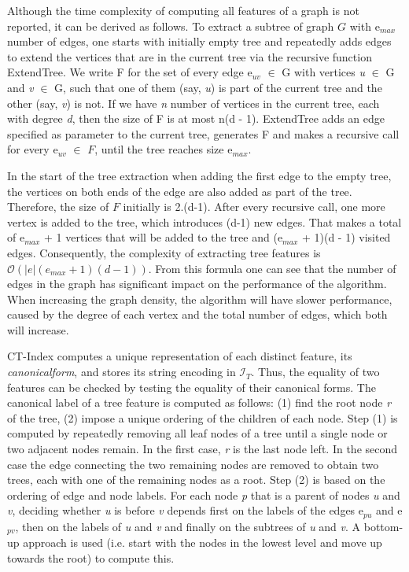 \documentclass{l4proj}
\newcommand{\fancyI}{\mathcal{I}}
\begin{document}
Although the time complexity of computing all features of a graph is not reported, it can be derived as follows. To extract a subtree of graph $G$ with e$_{max}$ number of edges, one starts with initially empty tree and repeatedly adds edges to extend the vertices that are in the current tree via the recursive function ExtendTree. We write F for the set of every edge e$_{uv}$ $\in$ G with vertices \textit{u} $\in$ G and \textit{v} $\in$ G, such that one of them (say, \textit{u}) is part of the current tree and the other (say, \textit{v}) is not. If we have \textit{n} number of vertices in the current tree, each with degree \textit{d}, then the size of F is at most n(d - 1). ExtendTree adds an edge specified as parameter to the current tree, generates F and makes a recursive call for every e$_{uv}$ $\in$ $F$, until the tree reaches size e$_{max}$.

In the start of the \gls{tree} extraction when adding the first edge to the empty tree, the vertices on both ends of the edge are also added as part of the tree. Therefore, the size of $F$ initially is 2.(d-1). After every recursive call, one more vertex is added to the tree, which introduces (d-1) new edges. That makes a total of e$_{max}$ + 1 vertices that will be added to the tree and (e$_{max}$ + 1)(d - 1) visited edges. Consequently, the complexity of extracting tree features is $\mathcal{O}(|e|(e_{max} + 1)(d - 1))$. From this formula one can see that the number of edges in the graph has significant impact on the performance of the algorithm. When increasing the graph density, the algorithm will have slower performance, caused by the degree of each vertex and the total number of edges, which both will increase.

CT-Index computes a unique representation of each distinct feature, its \emph{\gls{canonicalform}}, and stores its string encoding in $\fancyI_{T}$. Thus, the equality of two features can be checked by testing the equality of their canonical forms. The canonical label of a tree feature is computed as follows: (1) find the root node \emph{r} of the tree, (2) impose a unique ordering of the children of each node. Step (1) is computed by repeatedly removing all leaf nodes of a tree until a single node or two adjacent nodes remain. In the first case, \emph{r} is the last node left. In the second case the edge connecting the two remaining nodes are removed to obtain two trees, each with one of the remaining nodes as a root.
Step (2) is based on the ordering of edge and node labels. For each node \textit{p} that is a parent of nodes \textit{u} and \textit{v}, deciding whether \textit{u} is before \textit{v} depends first on the labels of the edges e$_{pu}$ and e$_{pv}$, then on the labels of \textit{u} and \textit{v} and finally on the subtrees of \textit{u} and \textit{v}. A bottom-up approach is used (i.e. start with the nodes in the lowest level and move up towards the root) to compute this.
\end{document}
